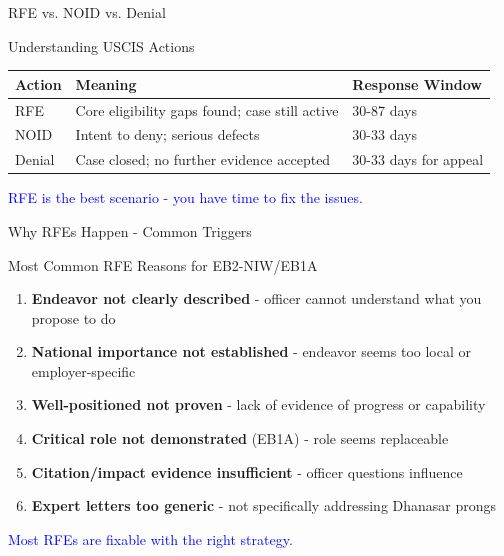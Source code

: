 \documentclass[11pt]{beamer}
\begin{document}
	\begin{frame}{RFE vs. NOID vs. Denial}
		\scriptsize
		\begin{block}{Understanding USCIS Actions}
			\centering
			\begin{tabular}{|p{3cm}|p{5cm}|p{2.5cm}|}
				\hline
				\textbf{Action} & \textbf{Meaning} & \textbf{Response Window} \\
				\hline
				RFE & Core eligibility gaps found; case still active & 30-87 days \\
				\hline
				NOID & Intent to deny; serious defects & 30-33 days \\
				\hline
				Denial & Case closed; no further evidence accepted & 30-33 days for appeal \\
				\hline
			\end{tabular}
			\vspace{0.2cm}
			\textcolor{blue}{RFE is the best scenario - you have time to fix the issues.}
		\end{block}
	\end{frame}
	
	\begin{frame}{Why RFEs Happen - Common Triggers}
		\scriptsize
		\begin{block}{Most Common RFE Reasons for EB2-NIW/EB1A}
			\begin{enumerate}
				\item \textbf{Endeavor not clearly described} - officer cannot understand what you propose to do
				\item \textbf{National importance not established} - endeavor seems too local or employer-specific
				\item \textbf{Well-positioned not proven} - lack of evidence of progress or capability
				\item \textbf{Critical role not demonstrated} (EB1A) - role seems replaceable
				\item \textbf{Citation/impact evidence insufficient} - officer questions influence
				\item \textbf{Expert letters too generic} - not specifically addressing Dhanasar prongs
			\end{enumerate}
			\textcolor{blue}{Most RFEs are fixable with the right strategy.}
		\end{block}
	\end{frame}
	
	
\end{document}
